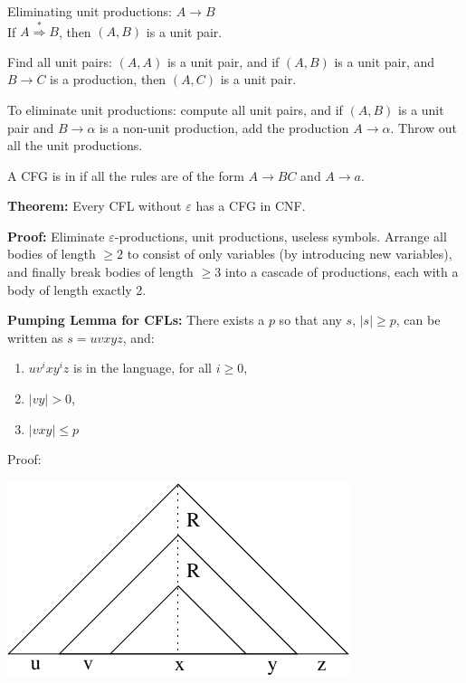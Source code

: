 \begin{frame}
Eliminating unit productions:
$A\longrightarrow B$ \\
If $A\stackrel{*}{\Rightarrow}B$, then $(A,B)$ is a unit pair.

Find all unit pairs: $(A,A)$ is a unit pair, and if $(A,B)$ is a unit
pair, and $B\longrightarrow C$ is a production, then $(A,C)$ is a unit
pair.

To eliminate unit productions: compute all unit pairs, and if $(A,B)$
is a unit pair and $B\longrightarrow\alpha$ is a non-unit production,
add the production $A\longrightarrow\alpha$.  Throw out
all the unit productions.

A CFG is in  if all the rules are of the form
$A\longrightarrow BC$ and $A\longrightarrow a$.

{\bf Theorem:}  Every CFL without $\varepsilon$ has a CFG in CNF.

{\bf Proof:} Eliminate $\varepsilon$-productions, unit
productions, useless symbols.  Arrange all bodies of
length $\ge 2$ to consist of only variables (by introducing new
variables), and finally break bodies of length $\ge 3$ into a cascade
of productions, each with a body of length exactly 2.
\end{frame}

\begin{frame}

{\bf Pumping Lemma for CFLs:} There exists a $p$ so that any $s$,
$|s|\geq p$, can be written as $s=uvxyz$, and:
\begin{enumerate}
\item  $uv^ixy^iz$ is in the language, for all $i\geq 0$,
\item  $|vy|>0$,
\item  $|vxy|\le p$
\end{enumerate}

Proof:
\begin{center}
\includegraphics{figures/10.pdf}
\end{center}
\end{frame}

